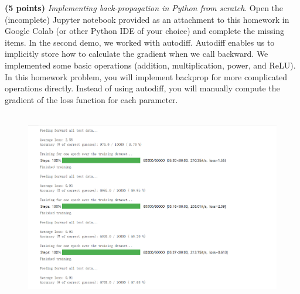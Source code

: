 \noindent {} 
\textbf{(5 points)} \textit{Implementing back-propagation in Python from scratch}. Open the (incomplete) Jupyter notebook provided as an attachment to this homework in Google Colab (or other Python IDE of your choice) and complete the missing items. In the second demo, we worked with autodiff. Autodiff enables us to implicitly store how to calculate the gradient when we call backward. We implemented some basic operations (addition, multiplication, power, and ReLU). In this homework problem, you will implement backprop for more complicated operations directly. Instead of using autodiff, you will manually compute the gradient of the loss function for each parameter.
\\ \\
\noindent {}
\begin{figure}[!h]
    \centering
    \includegraphics[width=\linewidth]{HWs//HW1//figures/4.png}
\end{figure}